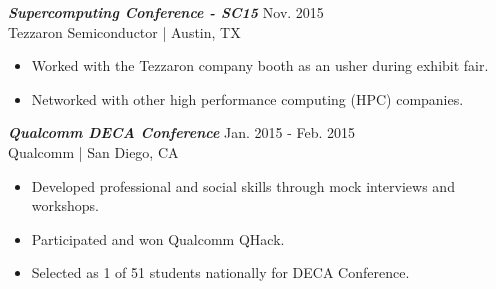 \documentclass[letter]{res}
\begin{document}
\begin{resume}
\vspace{-2mm}

{\sl \textbf{Supercomputing Conference - SC15}} \hfill Nov. 2015\\
Tezzaron Semiconductor | Austin, TX \newline

 \vspace{-4mm}

 \begin{itemize}
 \item Worked with the Tezzaron company booth as an usher during exhibit fair.
 \item Networked with other high performance computing (HPC) companies.
 \end{itemize}
 
\vspace{-2mm}

{\sl \textbf{Qualcomm DECA Conference}} \hfill Jan. 2015 - Feb. 2015\\
Qualcomm | San Diego, CA \newline

 \vspace{-4mm}

 \begin{itemize}
 \item Developed professional and social skills through mock interviews and workshops.
 \item Participated and won Qualcomm QHack.
 \item Selected as 1 of 51 students nationally for DECA Conference.
 \end{itemize}
 
\vspace{-2mm}
 



 
 

\end{resume}
\end{document}
